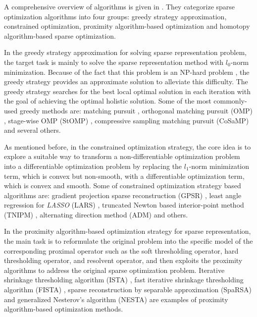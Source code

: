 \documentclass[journal]{IEEEtran}
\begin{document}
A comprehensive overview of algorithms is given in \cite{Zhang2015}. They categorize sparse optimization algorithms into four groups: greedy strategy approximation, constrained optimization, proximity algorithm-based optimization and homotopy algorithm-based sparse optimization. 

In the greedy strategy approximation for solving sparse representation problem, the target task is mainly to solve the sparse representation method with $l_0$-norm minimization. Because of the fact that this problem is an NP-hard problem , the greedy strategy provides an approximate solution to alleviate this difficulty. The greedy strategy searches for the best local optimal solution in each iteration with the goal of achieving the optimal holistic solution. Some of the most commonly-used greedy methods are: matching pursuit \cite{chen2001atomic}, orthogonal matching pursuit (OMP) \cite{pati1993orthogonal}, stage-wise OMP (StOMP) \cite{donoho2012sparse}, compressive sampling matching pursuit (CoSaMP) \cite{needell2009cosamp} and several others. 

As mentioned before, in the constrained optimization strategy, the core idea is to explore a suitable way to transform a non-differentiable optimization problem into a differentiable optimization problem by replacing the $l_1$-norm minimization term, which is convex but non-smooth, with a differentiable optimization term, which is convex and smooth. Some of constrained optimization strategy based algorithms are: gradient projection sparse reconstruction (GPSR) \cite{figueiredo2007gradient}, least angle regression for \textit{LASSO} (LARS) \cite{efron2004least}, truncated Newton based interior-point method (TNIPM) \cite{portugal2000truncated}, alternating direction method (ADM) \cite{yang2011alternating} and others.

In the proximity algorithm-based optimization strategy for sparse representation, the main task is to reformulate the original problem into the specific model of the corresponding proximal operator such as the soft thresholding operator, hard thresholding operator, and resolvent operator, and then exploits the proximity algorithms to address the original sparse optimization problem. Iterative shrinkage thresholding algorithm (ISTA) \cite{figueiredo2005bound}, fast iterative shrinkage thresholding algorithm (FISTA) \cite{beck2009fast}, sparse reconstruction by separable approximation (SpaRSA) \cite{Wright2009} and generalized Nesterov's algorithm (NESTA) \cite{becker2011nesta} are examples of proximity algorithm-based optimization methods.
\end{document}
